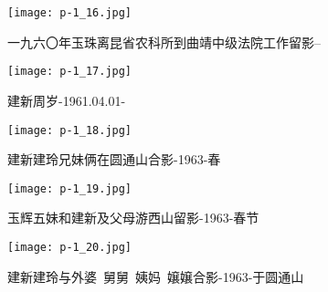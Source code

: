 \clearpage


\begin{figure}
    \begin{center}
        \texttt{[image: p-1\_16.jpg]}
        \begin{shaded}
            \caption{一九六〇年玉珠离昆省农科所到曲靖中级法院工作留影--}
        \end{shaded}
    \end{center}
\end{figure}

\clearpage


\begin{figure}
    \begin{center}
        \texttt{[image: p-1\_17.jpg]}
        \begin{shaded}
            \caption{建新周岁-1961.04.01-}
        \end{shaded}
    \end{center}
\end{figure}

\clearpage


\begin{figure}
    \begin{center}
        \texttt{[image: p-1\_18.jpg]}
        \begin{shaded}
            \caption{建新建玲兄妹俩在圆通山合影-1963-春}
        \end{shaded}
    \end{center}
\end{figure}

\clearpage


\begin{figure}
    \begin{center}
        \texttt{[image: p-1\_19.jpg]}
        \begin{shaded}
            \caption{玉辉五妹和建新及父母游西山留影-1963-春节}
        \end{shaded}
    \end{center}
\end{figure}

\clearpage


\begin{figure}
    \begin{center}
        \texttt{[image: p-1\_20.jpg]}
        \begin{shaded}
            \caption{建新建玲与外婆~舅舅~姨妈~嬢嬢合影-1963-于圆通山}
        \end{shaded}
    \end{center}
\end{figure}

